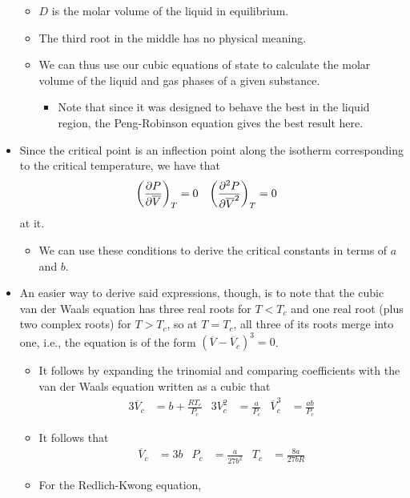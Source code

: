 \documentclass[../notes.tex]{subfiles}
\begin{document}
\begin{itemize}
\begin{itemize}
        \item $D$ is the molar volume of the liquid in equilibrium.
        \item The third root in the middle has no physical meaning.
        \item We can thus use our cubic equations of state to calculate the molar volume of the liquid and gas phases of a given substance.
        \begin{itemize}
            \item Note that since it was designed to behave the best in the liquid region, the Peng-Robinson equation gives the best result here.
        \end{itemize}
    \end{itemize}
    \item Since the critical point is an inflection point along the isotherm corresponding to the critical temperature, we have that
    \begin{align*}
        \left( \pdv{P}{\overline{V}} \right)_T &= 0&
        \left( \pdv[2]{P}{\overline{V}} \right)_T &= 0
    \end{align*}
    at it.
    \begin{itemize}
        \item We can use these conditions to derive the critical constants in terms of $a$ and $b$.
    \end{itemize}
    \item An easier way to derive said expressions, though, is to note that the cubic van der Waals equation has three real roots for $T<T_c$ and one real root (plus two complex roots) for $T>T_c$, so at $T=T_c$, all three of its roots merge into one, i.e., the equation is of the form $(\overline{V}-\overline{V}_c)^3=0$.
    \begin{itemize}
        \item It follows by expanding the trinomial and comparing coefficients with the van der Waals equation written as a cubic that
        \begin{align*}
            3\overline{V}_c &= b+\frac{RT_c}{P_c}&
            3V_c^2 &= \frac{a}{P_c}&
            \overline{V}_c^3 &= \frac{ab}{P_c}
        \end{align*}
        \item It follows that
        \begin{align*}
            \overline{V}_c &= 3b&
            P_c &= \frac{a}{27b^2}&
            T_c &= \frac{8a}{27bR}
        \end{align*}
        \item For the Redlich-Kwong equation,

\end{itemize}
\end{itemize}
\end{document}
